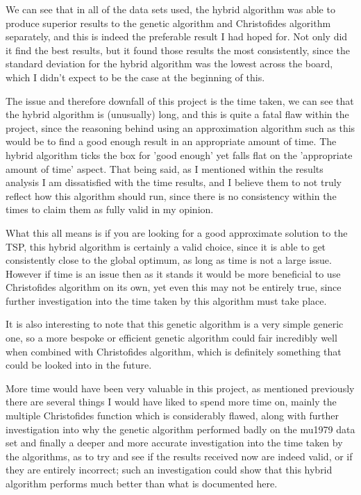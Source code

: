 \documentclass[11pt,a4paper,titlepage]{article}
\begin{document}
We can see that in all of the data sets used, the hybrid algorithm was able to produce superior results to the genetic algorithm and Christofides algorithm separately, and this is indeed the preferable result I had hoped for. Not only did it find the best results, but it found those results the most consistently, since the standard deviation for the hybrid algorithm was the lowest across the board, which I didn't expect to be the case at the beginning of this.

The issue and therefore downfall of this project is the time taken, we can see that the hybrid algorithm is (unusually) long, and this is quite a fatal flaw within the project, since the reasoning behind using an approximation algorithm such as this would be to find a good enough result in an appropriate amount of time. The hybrid algorithm ticks the box for 'good enough' yet falls flat on the 'appropriate amount of time' aspect. That being said, as I mentioned within the results analysis I am dissatisfied with the time results, and I believe them to not truly reflect how this algorithm should run, since there is no consistency within the times to claim them as fully valid in my opinion.

What this all means is if you are looking for a good approximate solution to the TSP, this hybrid algorithm is certainly a valid choice, since it is able to get consistently close to the global optimum, as long as time is not a large issue. However if time is an issue then as it stands it would be more beneficial to use Christofides algorithm on its own, yet even this may not be entirely true, since further investigation into the time taken by this algorithm must take place.

It is also interesting to note that this genetic algorithm is a very simple generic one, so a more bespoke or efficient genetic algorithm could fair incredibly well when combined with Christofides algorithm, which is definitely something that could be looked into in the future.

More time would have been very valuable in this project, as mentioned previously there are several things I would have liked to spend more time on, mainly the multiple Christofides function which is considerably flawed, along with further investigation into why the genetic algorithm performed badly on the mu1979 data set and finally a deeper and more accurate investigation into the time taken by the algorithms, as to try and see if the results received now are indeed valid, or if they are entirely incorrect; such an investigation could show that this hybrid algorithm performs much better than what is documented here.
\end{document}
